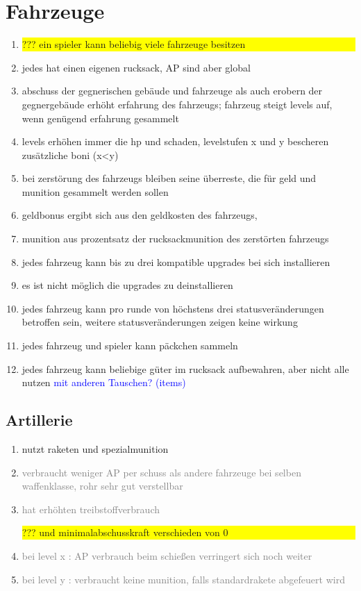\documentclass[10pt,a4paper,final]{scrartcl}
\newcommand{\ueberdenken}[1]{\colorbox{yellow}{\parbox{\textwidth}{??? #1}}}
\newcommand{\unwichtig}[1]{\textcolor{gray}{#1}}
\newcommand{\notiz}[1]{\textcolor{blue}{#1}}
\begin{document}
\section{Fahrzeuge}
\begin{enumerate}
\item \ueberdenken{ein spieler kann beliebig viele fahrzeuge besitzen}
\item jedes hat einen eigenen rucksack, AP sind aber global
\item abschuss der gegnerischen gebäude und fahrzeuge als auch erobern der gegnergebäude erhöht erfahrung des fahrzeugs;
fahrzeug steigt levels auf, wenn genügend erfahrung gesammelt
\item levels erhöhen immer die hp und schaden, levelstufen x und y bescheren zusätzliche boni (x<y)
\item bei zerstörung des fahrzeugs bleiben seine überreste, die für geld und munition gesammelt werden sollen
\item geldbonus ergibt sich aus den geldkosten des fahrzeugs, 
\item munition aus prozentsatz der rucksackmunition des zerstörten fahrzeugs
\item jedes fahrzeug kann bis zu drei kompatible upgrades bei sich installieren
\item es ist nicht möglich die upgrades zu deinstallieren
\item jedes fahrzeug kann pro runde von höchstens drei statusveränderungen betroffen sein, weitere statusveränderungen
zeigen keine wirkung
\item jedes fahrzeug und spieler kann päckchen sammeln
\item jedes fahrzeug kann beliebige güter im rucksack aufbewahren, aber nicht alle nutzen \notiz{mit anderen Tauschen? (items)}
\end{enumerate}

\subsection{Artillerie}
\begin{enumerate}
\item nutzt raketen und spezialmunition 
\item \unwichtig{verbraucht weniger AP per schuss als andere fahrzeuge bei selben waffenklasse, rohr sehr gut verstellbar}
\item \unwichtig{hat erhöhten treibstoffverbrauch} \ueberdenken{ und minimalabschusskraft verschieden von 0}
\item \unwichtig{bei level x : AP verbrauch beim schießen verringert sich noch weiter}
\item \unwichtig{bei level y : verbraucht keine munition, falls standardrakete abgefeuert wird}
\end{enumerate}
\end{document}
